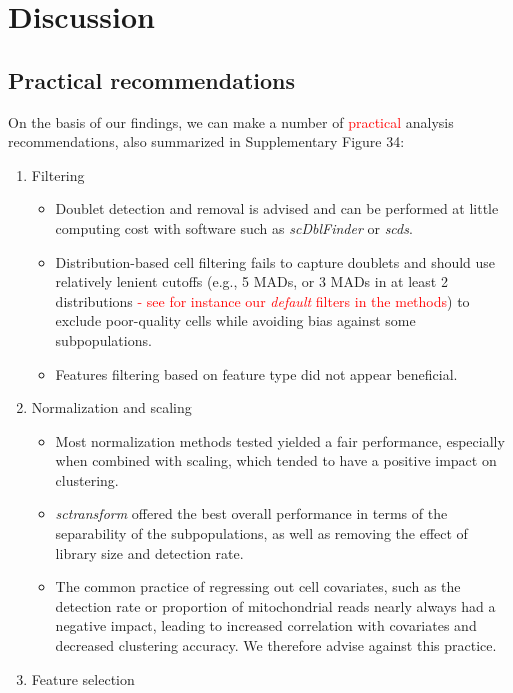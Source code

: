 \documentclass{bmcart}
\begin{document}
\section*{Discussion}

\subsection*{{\color{red}Practical} recommendations}

On the basis of our findings, we can make a number of \textcolor{red}{practical} analysis recommendations, also summarized in Supplementary Figure 34:

\begin{enumerate}
   \item Filtering
   \begin{itemize}
     \item Doublet detection and removal is advised and can be performed at little computing cost with software such as \textit{scDblFinder} or \textit{scds}.
     \item Distribution-based cell filtering fails to capture doublets and should use relatively lenient cutoffs (e.g., 5 MADs, or 3 MADs in at least 2 distributions \textcolor{red}{- see for instance our \textit{default} filters in the methods}) to exclude poor-quality cells while avoiding bias against some subpopulations.
     \item Features filtering based on feature type did not appear beneficial.
   \end{itemize}
   \item Normalization and scaling
   \begin{itemize}
     \item Most normalization methods tested yielded a fair performance, especially when combined with scaling, which tended to have a positive impact on clustering.
     \item \textit{sctransform} offered the best overall performance in terms of the separability of the subpopulations, as well as removing the effect of library size and detection rate.
     \item The common practice of regressing out cell covariates, such as the detection rate or proportion of mitochondrial reads nearly always had a negative impact, leading to increased correlation with covariates and decreased clustering accuracy. We therefore advise against this practice.
   \end{itemize}
   \item Feature selection

\end{enumerate}
\end{document}
